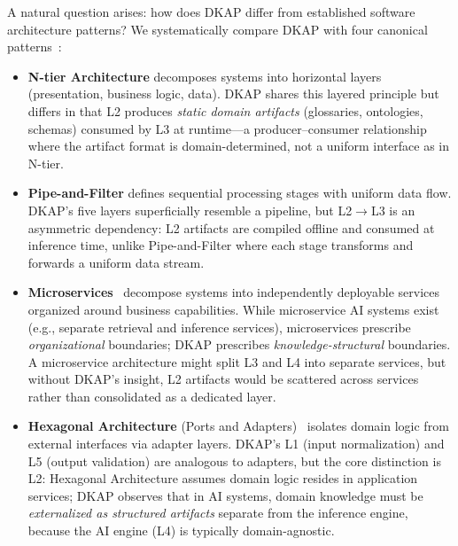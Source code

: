\documentclass[fleqn,10pt,lineno]{wlpeerj}
\begin{document}
A natural question arises: how does DKAP differ from established software architecture patterns? We systematically compare DKAP with four canonical patterns~\citep{garlan1993intro,bass2021practice,newman2021microservices,richards2020fundamentals}:

\begin{itemize}[leftmargin=*,itemsep=2pt]
\item \textbf{N-tier Architecture} decomposes systems into horizontal layers (presentation, business logic, data). DKAP shares this layered principle but differs in that L2 produces \textit{static domain artifacts} (glossaries, ontologies, schemas) consumed by L3 at runtime---a producer--consumer relationship where the artifact format is domain-determined, not a uniform interface as in N-tier.

\item \textbf{Pipe-and-Filter} defines sequential processing stages with uniform data flow. DKAP's five layers superficially resemble a pipeline, but L2$\to$L3 is an asymmetric dependency: L2 artifacts are compiled offline and consumed at inference time, unlike Pipe-and-Filter where each stage transforms and forwards a uniform data stream.

\item \textbf{Microservices}~\citep{newman2021microservices} decompose systems into independently deployable services organized around business capabilities. While microservice AI systems exist (e.g., separate retrieval and inference services), microservices prescribe \textit{organizational} boundaries; DKAP prescribes \textit{knowledge-structural} boundaries. A microservice architecture might split L3 and L4 into separate services, but without DKAP's insight, L2 artifacts would be scattered across services rather than consolidated as a dedicated layer.

\item \textbf{Hexagonal Architecture} (Ports and Adapters)~\citep{richards2020fundamentals} isolates domain logic from external interfaces via adapter layers. DKAP's L1 (input normalization) and L5 (output validation) are analogous to adapters, but the core distinction is L2: Hexagonal Architecture assumes domain logic resides in application services; DKAP observes that in AI systems, domain knowledge must be \textit{externalized as structured artifacts} separate from the inference engine, because the AI engine (L4) is typically domain-agnostic.
\end{itemize}
\end{document}
